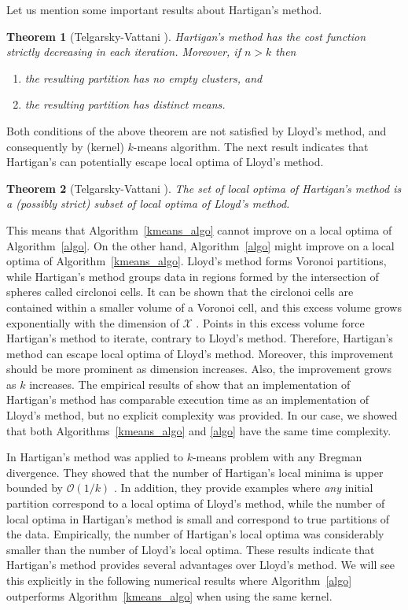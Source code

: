 \documentclass[aps,preprint,nofootinbib,floatfix]{revtex4-1}
\newtheorem{theorem}{Theorem}
\begin{document}
Let us mention some important results about Hartigan's method.

\begin{theorem}[Telgarsky-Vattani \cite{Telgarsky}]
Hartigan's method has the cost function strictly decreasing in each
iteration. Moreover, if $n > k$ then 
\begin{enumerate}
\item \label{noempty} the resulting partition has no empty clusters, and
\item \label{diffmean} the resulting partition has distinct means.
\end{enumerate}
\end{theorem}

Both conditions of the  above theorem are not satisfied 
by Lloyd's method, and consequently by (kernel) $k$-means algorithm.
The next result indicates that Hartigan's can potentially 
escape local optima of Lloyd's method.

\begin{theorem}[Telgarsky-Vattani \cite{Telgarsky}]
The set of local optima of Hartigan's method is a (possibly strict) subset
of local optima of Lloyd's method.
\end{theorem}

This means that Algorithm~\ref{kmeans_algo} cannot
improve on a local optima of Algorithm~\ref{algo}. On the other hand,
Algorithm~\ref{algo} might improve on a local optima of 
Algorithm~\ref{kmeans_algo}. Lloyd's method forms Voronoi partitions,
while Hartigan's method groups data
in regions formed by the intersection of spheres called circlonoi cells.
It can be shown that the circlonoi cells are contained within
a smaller volume of a Voronoi cell, and this excess volume grows
exponentially with the dimension of $\mathcal{X}$ 
\cite[Theorems 2.4 and 3.1]{Telgarsky}. 
Points in this excess volume
force Hartigan's method to iterate, contrary
to Lloyd's method. Therefore, Hartigan's method 
can escape local
optima of Lloyd's method. 
Moreover, this improvement should be more prominent as
dimension increases. Also, the improvement grows as $k$
increases.
The empirical results of \cite{Telgarsky} show that 
an implementation of Hartigan's method has comparable execution time 
as an implementation of
Lloyd's method,
but no explicit complexity was provided. In our case, we showed that both
Algorithms~\ref{kmeans_algo} and \ref{algo} have the same time complexity.

In \cite{Slonin} Hartigan's method was applied to $k$-means problem
with any Bregman divergence. They showed that the number of Hartigan's
local minima is upper bounded by $\mathcal{O}(1/k)$ 
\cite[Proposition 5.1]{Slonin}. 
In addition, they provide examples where
\emph{any} initial partition correspond to a local optima of Lloyd's 
method, while  the number of local optima in Hartigan's method is small and 
correspond to true partitions of the data. Empirically, the number of
Hartigan's local optima was considerably smaller than the number of Lloyd's
local optima.
These results indicate that Hartigan's method
provides several advantages over Lloyd's method. 
We will see this explicitly in the following 
numerical results where Algorithm~\ref{algo}
outperforms Algorithm~\ref{kmeans_algo} when using the same kernel.
\end{document}
